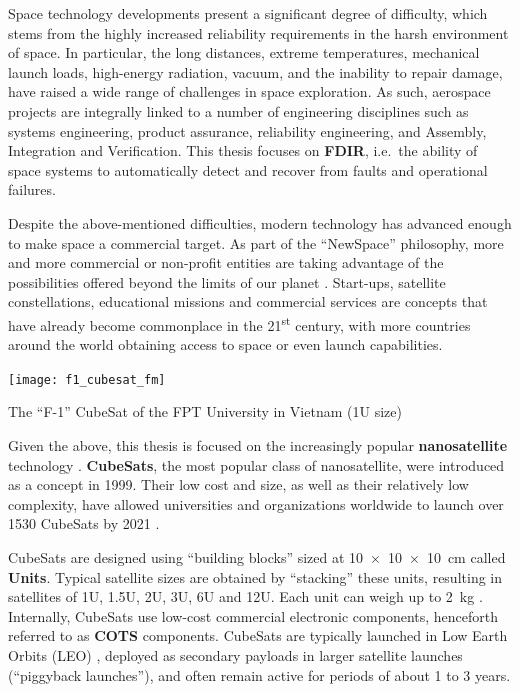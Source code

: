 \documentclass[a4paper,nobib,final]{tufte-book}
\def\acusepage#1{}
\begin{document}
Space technology developments present a significant degree of difficulty, which stems from the highly increased reliability requirements in the harsh environment of space. In particular, the long distances, extreme temperatures, mechanical launch loads, high-energy radiation, vacuum, and the inability to repair damage, have raised a wide range of challenges in space exploration. As such, aerospace projects are integrally linked to a number of engineering disciplines such as systems engineering, product assurance, reliability engineering, and Assembly, Integration and Verification. This thesis focuses on \textbf{\acf{FDIR}}, i.e.\ the ability of space systems to automatically detect and recover from faults and operational failures.%
	
Despite the above-mentioned difficulties, modern technology has advanced enough to make space a commercial target. As part of the ``NewSpace'' philosophy, more and more commercial or non-profit entities are taking advantage of the possibilities offered beyond the limits of our planet \autocite{denis_new_space_2020}. Start-ups, satellite constellations, educational missions and commercial services are concepts that have already become commonplace in the 21\textsuperscript{st} century, with more countries around the world obtaining access to space or even launch capabilities.
	
\begin{marginfigure}
	\texttt{[image: f1\_cubesat\_fm]}
	\caption{The ``F-1'' CubeSat of the FPT University in Vietnam (1U size)}
	\label{fig:cubesat}
\end{marginfigure}

Given the above, this thesis is focused on the increasingly popular \textbf{nanosatellite} technology \autocite{sweeting_modern_small_2018a}. \textbf{CubeSats}, the most popular class of nanosatellite, were introduced as a concept in 1999. Their low cost and size, as well as their relatively low complexity, have allowed universities and organizations worldwide to launch over 1530 CubeSats by 2021 \autocite{swartwout_cubesat_database_2021}.
	
CubeSats are designed using ``building blocks'' sized at \SI[product-units = single]{10 x 10 x 10}{\centi\metre} called \textbf{Units}. Typical satellite sizes are obtained by ``stacking'' these units, resulting in satellites of 1U, 1.5U, 2U, 3U, 6U and 12U. Each unit can weigh up to \SI{2}{\kilogram} \autocite{CDS14}. Internally,  CubeSats use low-cost commercial electronic components, henceforth referred to as \textbf{\acf{COTS}} components. CubeSats are typically launched in Low Earth Orbits (\acs{LEO}) \autocite{anthopoulos_orbital_analysis_2020,riebeek_catalog_earth_2009}, deployed as secondary payloads in larger satellite launches (``piggyback launches''), and often remain active for periods of about 1 to 3 years.
\end{document}
